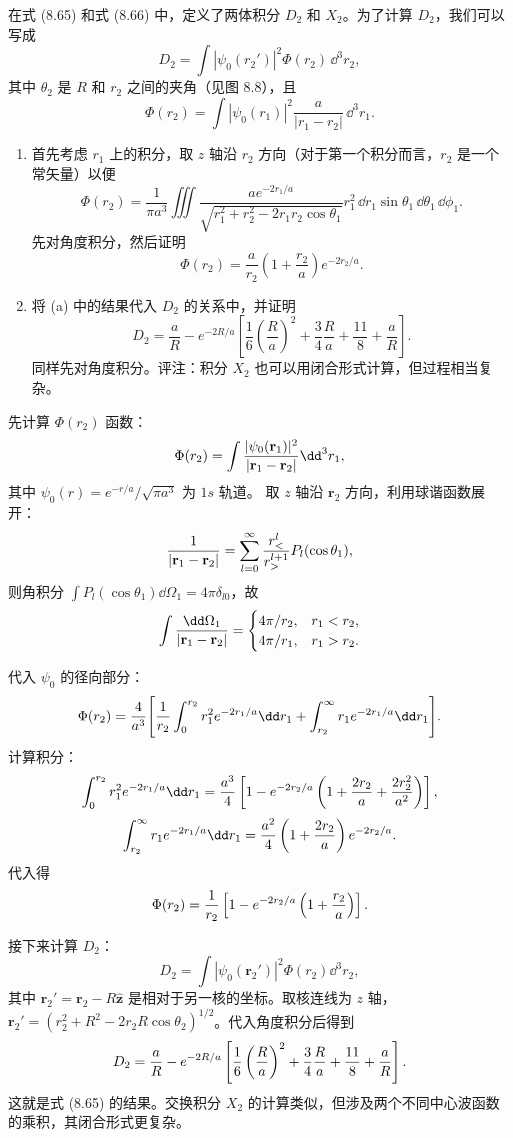 \begin{question}
在式 (8.65) 和式 (8.66) 中，定义了两体积分 $D_2$ 和 $X_2$。为了计算 $D_2$，我们可以写成
\[
D_2=\int |\psi_0(r_2')|^2\Phi(r_2)\,\dd^3 r_2,
\]
其中 $\theta_2$ 是 $R$ 和 $r_2$ 之间的夹角（见图 8.8），且
\[
\Phi(r_2)=\int |\psi_0(r_1)|^2\frac{a}{|r_1-r_2|}\,\dd^3r_1.
\]
\begin{enumerate}
\item 首先考虑 $r_1$ 上的积分，取 $z$ 轴沿 $r_2$ 方向（对于第一个积分而言，$r_2$ 是一个常矢量）以便
\[
\Phi(r_2)=\frac{1}{\pi a^3}\iiint\frac{a e^{-2r_1/a}}{\sqrt{r_1^2+r_2^2-2r_1r_2\cos\theta_1}}r_1^2\,\dd r_1\sin\theta_1\,\dd\theta_1\,\dd\phi_1.
\]
先对角度积分，然后证明
\[
\Phi(r_2)=\frac{a}{r_2}\left(1+\frac{r_2}{a}\right)e^{-2r_2/a}.
\]
\item 将 (a) 中的结果代入 $D_2$ 的关系中，并证明
\[
D_2=\frac{a}{R}-e^{-2R/a}\left[\frac{1}{6}\left(\frac{R}{a}\right)^2+\frac34\frac{R}{a}+\frac{11}{8}+\frac{a}{R}\right].
\]
同样先对角度积分。评注：积分 $X_2$ 也可以用闭合形式计算，但过程相当复杂。
\end{enumerate}

\par\smallskip
{}

\end{question}
\begin{solution}
先计算 $\Phi(r_2)$ 函数：
\[
\Phi(r_2)=\int{|\psi_0(\mathbf r_1)|^2\over|\mathbf r_1-\mathbf r_2|}\dd^3r_1,
\]
其中 $\psi_0(r)=e^{-r/a}/\sqrt{\pi a^3}$ 为 $1s$ 轨道。
取 $z$ 轴沿 $\mathbf r_2$ 方向，利用球谐函数展开：
\[
{1\over|\mathbf r_1-\mathbf r_2|}=\sum_{l=0}^\infty{r_<^l\over r_>^{l+1}}P_l(\cos\theta_1),
\]
则角积分 $\int P_l(\cos\theta_1)\dd\Omega_1=4\pi\delta_{l0}$，故
\[
\int{\dd\Omega_1\over|\mathbf r_1-\mathbf r_2|}=
\begin{cases}
4\pi/r_2, & r_1<r_2,\\
4\pi/r_1, & r_1>r_2.
\end{cases}
\]

代入 $\psi_0$ 的径向部分：
\[
\Phi(r_2)={4\over a^3}\Bigg[{1\over r_2}\int_0^{r_2}r_1^2 e^{-2r_1/a}\dd r_1
+\int_{r_2}^\infty r_1 e^{-2r_1/a}\dd r_1\Bigg].
\]
计算积分：
\[
\int_0^{r_2}r_1^2e^{-2r_1/a}\dd r_1
={a^3\over4}\left[1-e^{-2r_2/a}\left(1+{2r_2\over a}+{2r_2^2\over a^2}\right)\right],
\]
\[
\int_{r_2}^\infty r_1 e^{-2r_1/a}\dd r_1
={a^2\over4}\left(1+{2r_2\over a}\right)e^{-2r_2/a}.
\]
代入得
\[
\Phi(r_2)={1\over r_2}\left[1-e^{-2r_2/a}\left(1+{r_2\over a}\right)\right].
\]

接下来计算 $D_2$：
\[
D_2=\int|\psi_0(\mathbf r_2')|^2\Phi(r_2)\dd^3 r_2,
\]
其中 $\mathbf r_2'=\mathbf r_2-R\hat{\mathbf z}$ 是相对于另一核的坐标。取核连线为 $z$ 轴，$\mathbf r_2'=(r_2^2+R^2-2r_2R\cos\theta_2)^{1/2}$。代入角度积分后得到
\[
D_2={a\over R}-e^{-2R/a}\left[{1\over6}\left({R\over a}\right)^2+{3\over4}{R\over a}+{11\over8}+{a\over R}\right].
\]
这就是式 (8.65) 的结果。交换积分 $X_2$ 的计算类似，但涉及两个不同中心波函数的乘积，其闭合形式更复杂。
\end{solution}

